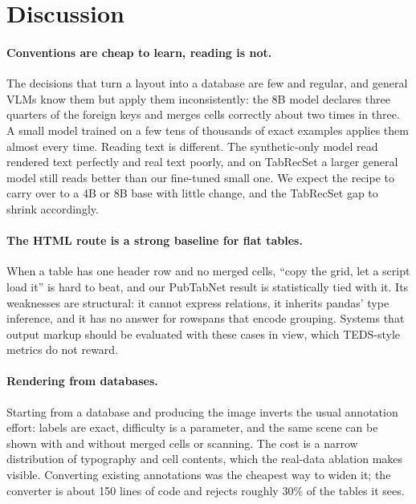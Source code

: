 \documentclass[10pt,twocolumn]{article}
\begin{document}
\section{Discussion}
\label{sec:discussion}

\paragraph{Conventions are cheap to learn, reading is not.} The decisions that turn a layout into a database are
few and regular, and general VLMs know them but apply them inconsistently: the 8B model declares three quarters of
the foreign keys and merges cells correctly about two times in three. A small model trained on a few tens of
thousands of exact examples applies them almost every time. Reading text is different. The synthetic-only model
read rendered text perfectly and real text poorly, and on TabRecSet a larger general model still reads better
than our fine-tuned small one. We expect the recipe to carry over to a 4B or 8B base with little change, and the
TabRecSet gap to shrink accordingly.

\paragraph{The HTML route is a strong baseline for flat tables.} When a table has one header row and no merged
cells, ``copy the grid, let a script load it'' is hard to beat, and our PubTabNet result is statistically tied
with it. Its weaknesses are structural: it cannot express relations, it inherits pandas' type inference, and it
has no answer for rowspans that encode grouping. Systems that output markup should be evaluated with these cases
in view, which TEDS-style metrics do not reward.

\paragraph{Rendering from databases.} Starting from a database and producing the image inverts the usual
annotation effort: labels are exact, difficulty is a parameter, and the same scene can be shown with and without
merged cells or scanning. The cost is a narrow distribution of typography and cell contents, which the real-data
ablation makes visible. Converting existing annotations was the cheapest way to widen it; the converter is about
150 lines of code and rejects roughly 30\% of the tables it sees.
\end{document}
